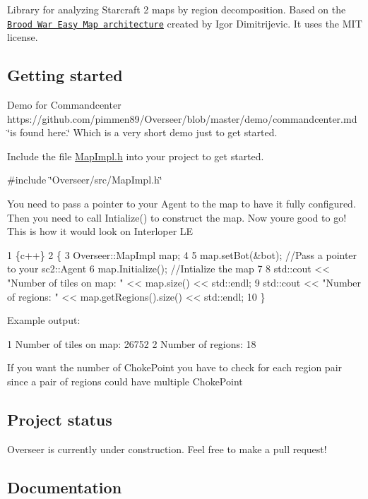 

Library for analyzing Starcraft 2 maps by region decomposition. Based on the \href{http://bwem.sourceforge.net/}{\tt Brood War Easy Map architecture} created by Igor Dimitrijevic. It uses the M\+IT license.

\subsection*{Getting started}

Demo for Commandcenter https\+://github.com/pimmen89/\+Overseer/blob/master/demo/commandcenter.\+md \char`\"{}is found here.\char`\"{} Which is a very short demo just to get started.

Include the file {\ttfamily \hyperlink{MapImpl_8h_source}{Map\+Impl.\+h}} into your project to get started.

{\ttfamily \#include \char`\"{}\+Overseer/src/\+Map\+Impl.\+h\char`\"{}}

You need to pass a pointer to your Agent to the map to have it fully configured. Then you need to call {\ttfamily Intialize()} to construct the map. Now you\textquotesingle{}re good to go! This is how it would look on Interloper LE


\begin{DoxyCode}
1 \{c++\}
2 \{
3     Overseer::MapImpl map;
4 
5     map.setBot(&bot); //Pass a pointer to your sc2::Agent
6     map.Initialize(); //Intialize the map
7 
8     std::cout << "Number of tiles on map: " << map.size() << std::endl;
9     std::cout << "Number of regions: " << map.getRegions().size() << std::endl;
10 \}
\end{DoxyCode}


Example output\+:


\begin{DoxyCode}
1 Number of tiles on map: 26752
2 Number of regions: 18
\end{DoxyCode}


If you want the number of {\ttfamily Choke\+Point} you have to check for each region pair since a pair of regions could have multiple {\ttfamily Choke\+Point}

\subsection*{Project status}

Overseer is currently under construction. Feel free to make a pull request!

\subsection*{Documentation}

